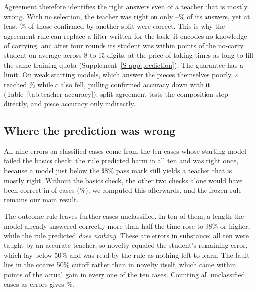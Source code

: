 Agreement therefore identifies the right answers even of a teacher that is
mostly wrong. With no selection, the teacher was right on only
\gpTaNoSelectAccLow--\gpTaNoSelectAccHigh\% of its answers, yet at least
\gpTaNoSelectAccConfirmedLow\% of those confirmed by another split were
correct. This is why the agreement rule can replace a filter written for the
task: it encodes no knowledge of carrying, and after four rounds its student
was within \gpGapMean{} points of the no-carry student on average across 8 to
15 digits, at the price of taking \gpBuildRatio{} times as long to fill the
same training quota (Supplement~\ref{S-app:prediction}). The guarantee has a
limit. On weak starting models, which answer the pieces themselves poorly,
$\varepsilon$ reached \gpTaWeakWrongConfirmedHigh\% while $c$ also fell,
pulling confirmed accuracy down with it (Table~\ref{tab:teacher-accuracy}):
split agreement tests the composition step directly, and piece accuracy only
indirectly.


\subsection{Where the prediction was wrong}
\label{sec:errors}

All nine errors on classified cases come from the ten cases whose starting
model failed the basics check: the rule predicted harm in all ten and was right
once, because a model just below the 98\% pass mark still yields a teacher that
is mostly right. Without the basics check, the other two checks alone would
have been correct in \gpCorrectNoBasics{} of \gpCases{} cases
(\gpCorrectNoBasicsPct\%); we computed this afterwards, and the frozen rule
remains our main result.

The outcome rule leaves \gpNoOutcome{} further cases unclassified. In ten of
them, a length the model already answered correctly more than half the time
rose to 98\% or higher, while the rule predicted \emph{does nothing}. These are
errors in substance: all ten were taught by an accurate teacher, so novelty
equaled the student's remaining error, which lay below 50\% and was read by the
rule as nothing left to learn. The fault lies in the coarse 50\% cutoff rather
than in novelty itself, which came within \gpNovGainSoundChangeGap{} points of
the actual gain in every one of the ten cases. Counting all \gpNoOutcome{}
unclassified cases as errors gives \gpCorrectAllPct\%.

